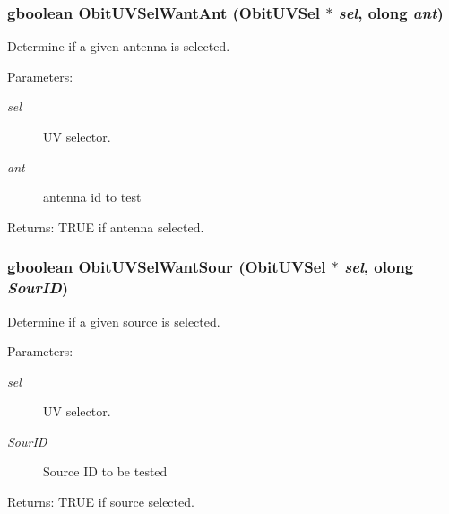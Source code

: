 \subsubsection{\setlength{\rightskip}{0pt plus 5cm}gboolean Obit\-UVSel\-Want\-Ant ({\bf Obit\-UVSel} $\ast$ {\em sel}, {\bf olong} {\em ant})}\label{ObitUVSel_8c_a20}


Determine if a given antenna is selected. 

\begin{Desc}
\item[Parameters:]
\begin{description}
\item[{\em sel}]UV selector. \item[{\em ant}]antenna id to test \end{description}
\end{Desc}
\begin{Desc}
\item[Returns:]TRUE if antenna selected. \end{Desc}
\subsubsection{\setlength{\rightskip}{0pt plus 5cm}gboolean Obit\-UVSel\-Want\-Sour ({\bf Obit\-UVSel} $\ast$ {\em sel}, {\bf olong} {\em Sour\-ID})}\label{ObitUVSel_8c_a19}


Determine if a given source is selected. 

\begin{Desc}
\item[Parameters:]
\begin{description}
\item[{\em sel}]UV selector. \item[{\em Sour\-ID}]Source ID to be tested \end{description}
\end{Desc}
\begin{Desc}
\item[Returns:]TRUE if source selected. \end{Desc}
